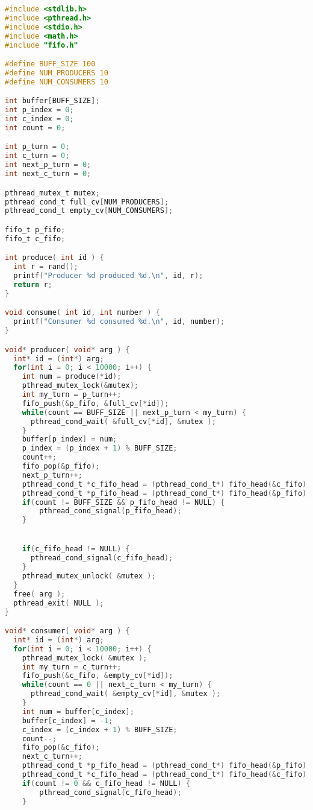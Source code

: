 \begin{lstlisting}[language=C]
#include <stdlib.h>
#include <pthread.h>
#include <stdio.h>
#include <math.h>
#include "fifo.h"

#define BUFF_SIZE 100
#define NUM_PRODUCERS 10
#define NUM_CONSUMERS 10

int buffer[BUFF_SIZE];
int p_index = 0;
int c_index = 0;
int count = 0;

int p_turn = 0;
int c_turn = 0;
int next_p_turn = 0;
int next_c_turn = 0;

pthread_mutex_t mutex;
pthread_cond_t full_cv[NUM_PRODUCERS];
pthread_cond_t empty_cv[NUM_CONSUMERS];

fifo_t p_fifo;
fifo_t c_fifo;

int produce( int id ) {
  int r = rand();
  printf("Producer %d produced %d.\n", id, r);
  return r;
}

void consume( int id, int number ) {
  printf("Consumer %d consumed %d.\n", id, number);
}

void* producer( void* arg ) {
  int* id = (int*) arg;
  for(int i = 0; i < 10000; i++) {
    int num = produce(*id);
    pthread_mutex_lock(&mutex);
    int my_turn = p_turn++;
    fifo_push(&p_fifo, &full_cv[*id]);
    while(count == BUFF_SIZE || next_p_turn < my_turn) {
      pthread_cond_wait( &full_cv[*id], &mutex );
    }
    buffer[p_index] = num;
    p_index = (p_index + 1) % BUFF_SIZE;
    count++;
    fifo_pop(&p_fifo);
    next_p_turn++;
    pthread_cond_t *c_fifo_head = (pthread_cond_t*) fifo_head(&c_fifo);
    pthread_cond_t *p_fifo_head = (pthread_cond_t*) fifo_head(&p_fifo);
    if(count != BUFF_SIZE && p_fifo_head != NULL) {
        pthread_cond_signal(p_fifo_head);
    }


    if(c_fifo_head != NULL) {
      pthread_cond_signal(c_fifo_head);
    }
    pthread_mutex_unlock( &mutex );
  }
  free( arg );
  pthread_exit( NULL );
}

void* consumer( void* arg ) {
  int* id = (int*) arg;
  for(int i = 0; i < 10000; i++) {
    pthread_mutex_lock( &mutex );
    int my_turn = c_turn++;
    fifo_push(&c_fifo, &empty_cv[*id]);
    while(count == 0 || next_c_turn < my_turn) {
      pthread_cond_wait( &empty_cv[*id], &mutex );
    }
    int num = buffer[c_index];
    buffer[c_index] = -1;
    c_index = (c_index + 1) % BUFF_SIZE;
    count--;
    fifo_pop(&c_fifo);
    next_c_turn++;
    pthread_cond_t *p_fifo_head = (pthread_cond_t*) fifo_head(&p_fifo);
    pthread_cond_t *c_fifo_head = (pthread_cond_t*) fifo_head(&c_fifo);
    if(count != 0 && c_fifo_head != NULL) {
        pthread_cond_signal(c_fifo_head);
    }


\end{lstlisting}
